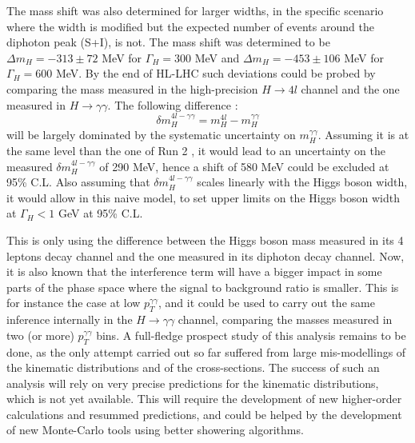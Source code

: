 The mass shift was also determined for larger widths, in the specific scenario where the width is modified but the expected number of events around the diphoton peak (S+I), is not. The mass shift was determined to be $\Delta m_H = -313\pm 72$ MeV for $\Gamma_H = 300$ MeV and $\Delta m_H = -453 \pm 106$ MeV for $\Gamma_H = 600$ MeV. By the end of HL-LHC such deviations could be probed by comparing the mass measured in the high-precision $H\rightarrow 4l$ channel and the one measured in $H\rightarrow\gamma\gamma$. The following difference :
\begin{equation}
    \delta m_H^{4l-\gamma\gamma} = m_H^{4l} - m_H^{\gamma\gamma}
\end{equation}
will be largely dominated by the systematic uncertainty on $m_H^{\gamma\gamma}$. Assuming it is at the same level than the one of Run 2 \cite{Aaboud:2018wps}, it would lead to an uncertainty on the measured $\delta m_H^{4l-\gamma\gamma}$ of 290 MeV, hence a shift of 580 MeV could be excluded at 95\% C.L. Also assuming that $\delta m_H^{4l-\gamma\gamma}$ scales linearly with the Higgs boson width, it would allow in this naive model, to set upper limits on the Higgs boson width at $\Gamma_H < 1$ GeV at 95\% C.L.

This is only using the difference between the Higgs boson mass measured in its 4 leptons decay channel and the one measured in its diphoton decay channel. Now, it is also known that the interference term will have a bigger impact in some parts of the phase space where the signal to background ratio is smaller. This is for instance the case at low $p_T^{\gamma\gamma}$, and it could be used to carry out the same inference internally in the $H\rightarrow\gamma\gamma$ channel, comparing the masses measured in two (or more) $p_T^{\gamma\gamma}$ bins. A full-fledge prospect study of this analysis remains to be done, as the only attempt carried out so far \cite{ATL-PHYS-PUB-2013-014} suffered from large mis-modellings of the kinematic distributions and of the cross-sections. The success of such an analysis will rely on very precise predictions for the kinematic distributions, which is not yet available. This will require the development of new higher-order calculations and resummed predictions, and could be helped by the development of new Monte-Carlo tools using better showering algorithms.
